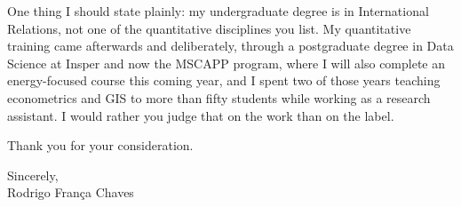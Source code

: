 One thing I should state plainly: my undergraduate degree is in International Relations, not one of the quantitative disciplines you list. My quantitative training came afterwards and deliberately, through a postgraduate degree in Data Science at Insper and now the MSCAPP program, where I will also complete an energy-focused course this coming year, and I spent two of those years teaching econometrics and GIS to more than fifty students while working as a research assistant. I would rather you judge that on the work than on the label.

Thank you for your consideration.

\vspace{6pt}

Sincerely, \\
Rodrigo França Chaves


